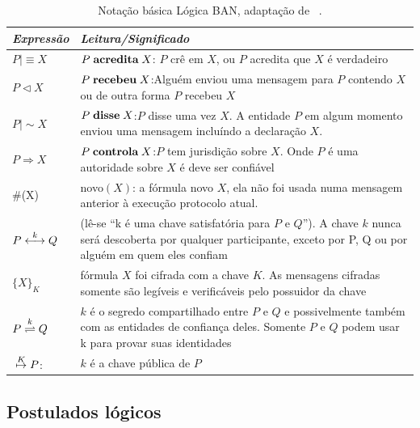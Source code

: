 \begin{table}[h]
    \begin{tabular}{|l|p{10cm}|}
    \hline
    \textbf{\emph{Expressão }}         & \textbf{\emph{Leitura/Significado}}                                                                               \\ \hline
    ${P}\mid\equiv{X}$               & ${P}\mathrel{\textbf{acredita}}{X}$: $P$ crê em $X$, ou $P$ acredita que $X$ é verdadeiro \\ \hline
    ${P}\triangleleft{X}$            & ${P}\mathrel{\textbf{recebeu}}{X}$:Alguém enviou uma mensagem para $P$ contendo $X$ ou de outra forma $P$ recebeu $X$   \\ \hline
    ${P}\mid\sim{X}$                 & ${P}\mathrel{\textbf{disse}}{X}$:$P$ disse uma vez $X$. A entidade $P$ em algum momento enviou uma mensagem incluíndo a declaração $X$.\\ \hline
    ${P}\Rightarrow {X}$                 & ${P}\mathrel{\textbf{controla}}{X}$:$P$ tem jurisdição sobre $X$. Onde $P$ é uma autoridade sobre $X$ é deve ser confiável \\ \hline
    \#(X)                            & novo$(X)$: a fórmula novo $X$, ela não foi usada numa mensagem anterior à execução protocolo atual.  \\ \hline
    ${P}\stackrel{k}{\longleftrightarrow}{Q}$                & (lê-se ``k é uma chave satisfatória para $P$ e $Q$''). A chave $k$ nunca será descoberta por qualquer participante, exceto por P, Q ou por alguém em quem eles confiam \\ \hline
    $\{{X}\}_K$                  & fórmula $X$ foi cifrada com a chave $K$. As mensagens cifradas somente são legíveis e verificáveis pelo possuidor da chave \\ \hline
    ${P}\stackrel{k}{\rightleftharpoons}{Q}$         & ${k}$ é o segredo compartilhado entre ${P}$ e ${Q}$ e possivelmente também com as entidades de confiança deles. Somente ${P}$ e ${Q}$ podem usar k para provar suas identidades \\ \hline
    ${}\stackrel{K}{\mapsto}{P}$:               & ${k}$ é a chave pública de ${P}$  \\ \hline
    \end{tabular}
    \caption {Notação básica Lógica BAN, adaptação de ~\cite{Burrows1990}.}
\label{tab:notacaobasicaBAN}
\end{table}



\subsection{Postulados lógicos}


